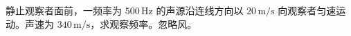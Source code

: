 静止观察者面前，一频率为 $500\,\mathrm{Hz}$ 的声源沿连线方向以 $20\,\mathrm{m/s}$ 向观察者匀速运动。声速为 $340\,\mathrm{m/s}$，求观察频率。忽略风。
